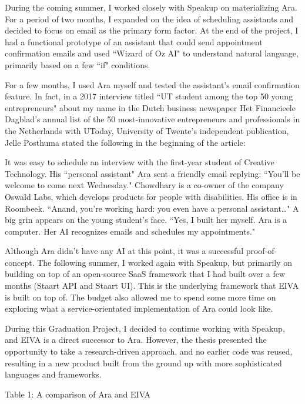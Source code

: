 \documentclass{article}
\begin{document}
During the coming summer, I worked closely with Speakup on materializing Ara. For a period of two months, I expanded on the idea of scheduling assistants and decided to focus on email as the primary form factor. At the end of the project, I had a functional prototype of an assistant that could send appointment confirmation emails and used ``Wizard of Oz AI" to understand natural language, primarily based on a few ``if" conditions.

For a few months, I used Ara myself and tested the assistant's email confirmation feature. In fact, in a 2017 interview titled ``UT student among the top 50 young entrepreneurs" about my name in the Dutch business newspaper Het Financieele Dagblad's annual list of the 50 most-innovative entrepreneurs and professionals in the Netherlands with UToday, University of Twente's independent publication, Jelle Posthuma stated the following in the beginning of the article:

\begin{displayquote}
It was easy to schedule an interview with the first-year student of Creative Technology. His ``personal assistant" Ara sent a friendly email replying: ``You’ll be welcome to come next Wednesday." Chowdhary is a co-owner of the company Oswald Labs, which develops products for people with disabilities. His office is in Roombeek. ``Anand, you’re working hard: you even have a personal assistant…" A big grin appears on the young student’s face. ``Yes, I built her myself. Ara is a computer. Her AI recognizes emails and schedules my appointments."
\end{displayquote}

Although Ara didn't have any AI at this point, it was a successful proof-of-concept. The following summer, I worked again with Speakup, but primarily on building on top of an open-source SaaS framework that I had built over a few months (Staart API and Staart UI). This is the underlying framework that EIVA is built on top of. The budget also allowed me to spend some more time on exploring what a service-orientated implementation of Ara could look like.

During this Graduation Project, I decided to continue working with Speakup, and EIVA is a direct successor to Ara. However, the thesis presented the opportunity to take a research-driven approach, and no earlier code was reused, resulting in a new product built from the ground up with more sophisticated languages and frameworks.

Table 1: A comparison of Ara and EIVA
\end{document}
